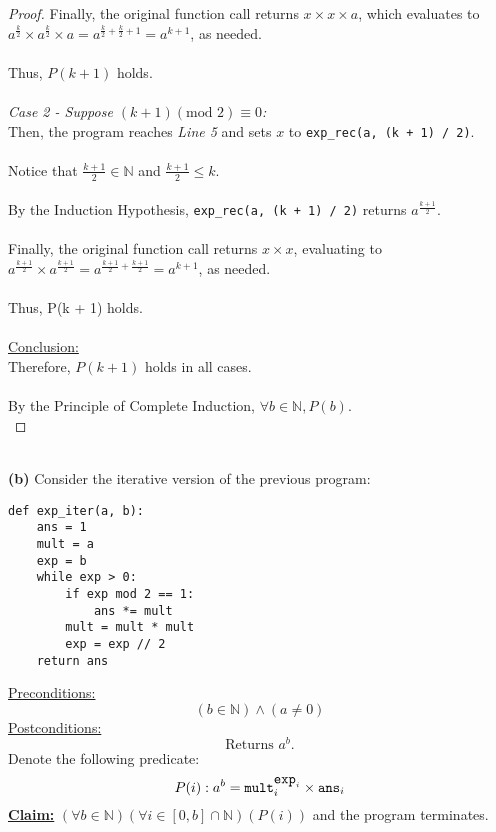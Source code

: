 \documentclass[12pt]{article}
\begin{document}
\begin{proof}
    Finally, the original function call returns $x \times x \times a$, which evaluates to $a^{\frac{k}{2}} \times a^{\frac{k}{2}} \times a = a^{\frac{k}{2} + \frac{k}{2} + 1} = a^{k + 1}$, as needed. \\
    \\
    Thus, $P(k + 1)$ holds. \\
    \\
    \textit{Case 2 - Suppose $(k + 1) (\text{mod } 2) \equiv 0$:} \\
    Then, the program reaches \textit{Line 5} and sets $x$ to \verb|exp_rec(a, (k + 1) / 2)|. \\
    \\
    Notice that $\frac{k + 1}{2} \in \mathbb{N}$ and $\frac{k + 1}{2} \leq k$. \\
    \\
    By the Induction Hypothesis, \verb|exp_rec(a, (k + 1) / 2)| returns $a^{\frac{k + 1}{2}}$. \\
    \\
    Finally, the original function call returns $x \times x$, evaluating to $a^{\frac{k + 1}{2}} \times a^{\frac{k + 1}{2}} = a^{\frac{k + 1}{2} + \frac{k + 1}{2}} = a^{k + 1}$, as needed. \\
    \\
    Thus, P(k + 1) holds. \\
    \\
    \underline{Conclusion:} \\
    Therefore, $P(k + 1)$ holds in all cases. \\
    \\
    By the Principle of Complete Induction, $\forall b \in \mathbb{N}, P(b)$. \\
\end{proof}
\leavevmode\\
\textbf{(b)} Consider the iterative version of the previous program:
\begin{lstlisting}
def exp_iter(a, b):
    ans = 1
    mult = a
    exp = b
    while exp > 0:
        if exp mod 2 == 1:
            ans *= mult
        mult = mult * mult
        exp = exp // 2
    return ans
\end{lstlisting}
\underline{Preconditions:}
\[
    (b \in \mathbb{N}) \land (a \neq 0)
\]
\underline{Postconditions:}
\[
    \text{Returns } a^b \text{.}
\]
Denote the following predicate:
\[P(i): a^b = \verb|mult|_i^{\verb|exp|_i} \times \verb|ans|_i \]
\textbf{\underline{Claim:}} $(\forall b \in \mathbb{N})(\forall i \in [0, b] \cap \mathbb{N})(P(i))$ and the program terminates.
\end{document}
